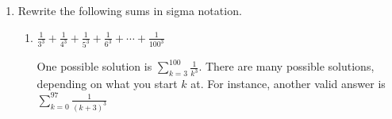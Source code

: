 \documentclass[main]{subfiles}
\begin{document}
\begin{enumerate}
\begin{enumerate}
    \item

    
    \begin{problem}[\vfill]
    $\displaystyle \sum_{k=0}^{25} \frac{x^{2k + 1}}{k + 1}$
    \end{problem}

    \begin{solution}
    $\displaystyle x + \frac{x^3}{2} + \frac{x^5}{3} + \frac{x^7}{4} +
    \cdots + \frac{x^{51}}{26}$
    \end{solution}

    \item
    
    
    \begin{problem}[\vfill]
    $\displaystyle \sum_{k=1}^{26} \frac{x^{2k - 1}}{k}$
    \end{problem}

    \begin{solution}
    $\displaystyle x + \frac{x^3}{2} + \frac{x^5}{3} + \frac{x^7}{4} +
    \cdots + \frac{x^{51}}{26}$
    \end{solution}
    
  \end{enumerate}





  \item 
  Rewrite the following sums in sigma notation.
  \begin{enumerate}
    \item
    \begin{problem}[0.5in]
    $\displaystyle \frac{1}{3^3} + \frac{1}{4^3} + \frac{1}{5^3} +
    \frac{1}{6^3} + \cdots + \frac{1}{100^3}$
    \end{problem}

    \begin{solution}
    One possible solution is $\displaystyle \sum_{k=3}^{100}
    \frac{1}{k^3}$.  There are many possible solutions, depending on
    what you start $k$ at.  For instance, another valid answer is
    $\displaystyle \sum_{k=0}^{97} \frac{1}{(k + 3)^3}$
    \end{solution}


\end{enumerate}
\end{enumerate}
\end{document}
